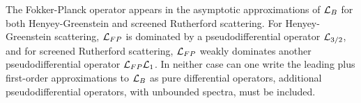 The Fokker-Planck operator appears in the asymptotic approximations of $\mathcal{L}_B$ 
for both Henyey-Greenstein and screened Rutherford scattering. For 
Henyey-Greenstein scattering, $\mathcal{L}_{FP}$ is dominated by a pseudodifferential 
operator $\mathcal{L}_{3/2}$, and for screened Rutherford scattering, $\mathcal{L}_{FP}$ 
weakly dominates another pseudodifferential operator $\mathcal{L}_{FP}\mathcal{L}_1$. In 
neither case can one write the leading plus first-order approximations to 
$\mathcal{L}_B$ as pure differential operators, additional pseudodifferential 
operators, with unbounded spectra, must be included\cite{larsen_fp}.
